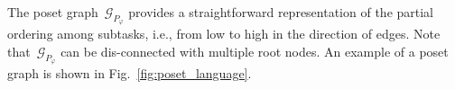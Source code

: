 The poset graph~$\mathcal{G}_{P_\varphi}$ provides a straightforward
representation of the partial ordering among subtasks,
i.e., from low to high in the direction of edges.
Note that~$\mathcal{G}_{P_\varphi}$ can be dis-connected with multiple root nodes.
An example of a poset graph is shown in Fig.~\ref{fig:poset_language}.

